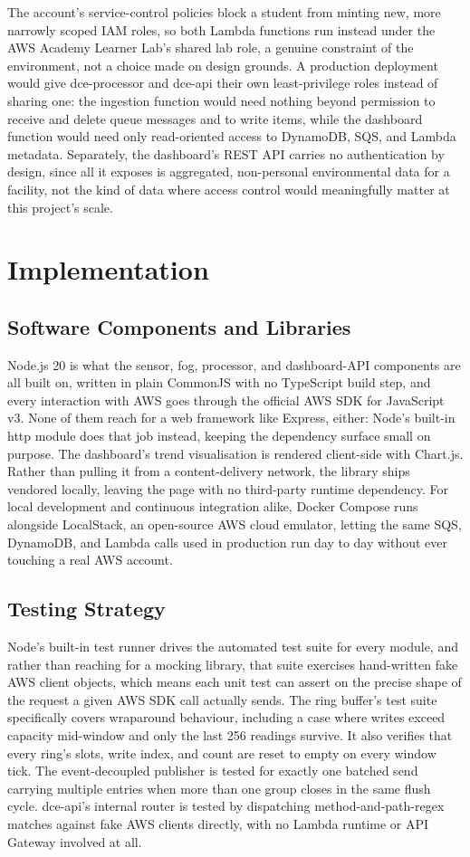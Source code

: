 \documentclass[conference]{IEEEtran}
\begin{document}
The account's service-control policies block a student from minting new, more narrowly scoped IAM roles, so both Lambda functions run instead under the AWS Academy Learner Lab's shared lab role, a genuine constraint of the environment, not a choice made on design grounds. A production deployment would give dce-processor and dce-api their own least-privilege roles instead of sharing one: the ingestion function would need nothing beyond permission to receive and delete queue messages and to write items, while the dashboard function would need only read-oriented access to DynamoDB, SQS, and Lambda metadata. Separately, the dashboard's REST API carries no authentication by design, since all it exposes is aggregated, non-personal environmental data for a facility, not the kind of data where access control would meaningfully matter at this project's scale.

\section{Implementation}

\subsection{Software Components and Libraries}
Node.js 20 is what the sensor, fog, processor, and dashboard-API components are all built on, written in plain CommonJS with no TypeScript build step, and every interaction with AWS goes through the official AWS SDK for JavaScript v3. None of them reach for a web framework like Express, either: Node's built-in http module does that job instead, keeping the dependency surface small on purpose. The dashboard's trend visualisation is rendered client-side with Chart.js. Rather than pulling it from a content-delivery network, the library ships vendored locally, leaving the page with no third-party runtime dependency. For local development and continuous integration alike, Docker Compose runs alongside LocalStack, an open-source AWS cloud emulator, letting the same SQS, DynamoDB, and Lambda calls used in production run day to day without ever touching a real AWS account.

\subsection{Testing Strategy}
Node's built-in test runner drives the automated test suite for every module, and rather than reaching for a mocking library, that suite exercises hand-written fake AWS client objects, which means each unit test can assert on the precise shape of the request a given AWS SDK call actually sends. The ring buffer's test suite specifically covers wraparound behaviour, including a case where writes exceed capacity mid-window and only the last 256 readings survive. It also verifies that every ring's slots, write index, and count are reset to empty on every window tick. The event-decoupled publisher is tested for exactly one batched send carrying multiple entries when more than one group closes in the same flush cycle. dce-api's internal router is tested by dispatching method-and-path-regex matches against fake AWS clients directly, with no Lambda runtime or API Gateway involved at all.
\end{document}
